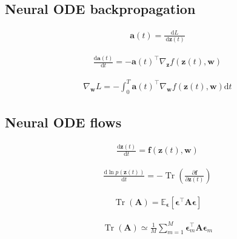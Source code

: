 \documentclass{article}
\begin{document}
\subsection{Neural ODE backpropagation}

\begin{align*}
\mathbf{a}(t) = \frac{\mathrm{d} L}{\mathrm{~d} \mathbf{z}(t)} 
\tag{18.24}
\end{align*}

\begin{align*}
\frac{\mathrm{d} \mathbf{a}(t)}{\mathrm{d} t} = -\mathbf{a}(t)^{\top} \nabla_{\mathbf{z}} f(\mathbf{z}(t), \mathbf{w}) 
\tag{18.25}
\end{align*}

\begin{align*}
\nabla_{\mathbf{w}} L = -\int_{0}^{T} \mathbf{a}(t)^{\top} \nabla_{\mathbf{w}} f(\mathbf{z}(t), \mathbf{w}) \mathrm{d} t 
\tag{18.26}
\end{align*}

\subsection{Neural ODE flows}

\begin{align*}
\frac{\mathrm{d} \mathbf{z}(t)}{\mathrm{d} t} = \mathbf{f}(\mathbf{z}(t), \mathbf{w}) 
\tag{18.27}
\end{align*}

\begin{align*}
\frac{\mathrm{d} \ln p(\mathbf{z}(t))}{\mathrm{d} t} = -\operatorname{Tr}\left(\frac{\partial \mathbf{f}}{\partial \mathbf{z}(t)}\right) 
\tag{18.28}
\end{align*}

\begin{align*}
\operatorname{Tr}(\mathbf{A}) = \mathbb{E}_{\boldsymbol{\epsilon}}\left[
\boldsymbol{\epsilon}^{\top} \mathbf{A} \boldsymbol{\epsilon}\right]
\tag{18.29}
\end{align*}

\begin{align*}
\operatorname{Tr}(\mathbf{A}) \simeq \frac{1}{M} \sum_{m=1}^{M} \boldsymbol{\epsilon}_{m}^{\top} \mathbf{A} \boldsymbol{\epsilon}_{m} 
\tag{18.30}
\end{align*}
\end{document}
